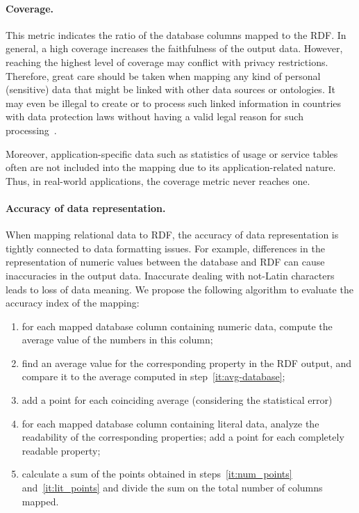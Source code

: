 \paragraph{Coverage.}
This metric indicates the ratio of the database columns mapped to the RDF. 
In general, a high coverage increases the faithfulness of the output data.
However, reaching the highest level of coverage may conflict with privacy restrictions.
Therefore, great care should be taken when mapping any kind of personal (sensitive) data that might be linked with other data sources or ontologies.
It may even be illegal to create or to process such linked information in countries with data protection laws without having a valid legal reason for such processing~\cite{bechhofer2004owl}.
 
Moreover, application-specific data such as statistics of usage or service tables often are not included into the mapping due to its application-related nature.
Thus, in real-world applications, the coverage metric never reaches one.

\paragraph{Accuracy of data representation.}
When mapping relational data to RDF, the accuracy of data representation is tightly connected to data formatting issues.
For example, differences in the representation of numeric values between the database and RDF can cause inaccuracies in the output data.
Inaccurate dealing with not-Latin characters leads to loss of data meaning. 
We propose the following algorithm to evaluate the accuracy index of the mapping:

\begin{enumerate}
\item\label{it:avg-database} for each mapped database column containing numeric data, compute the average value of the numbers in this column;
\item find an average value for the corresponding property in the RDF output, and compare it to the average computed in step~\ref{it:avg-database};
\item\label{it:num_points} add a point for each coinciding average (considering the statistical error)
\item\label{it:lit_points} for each mapped database column containing literal data, analyze the readability of the corresponding properties; add a point for each completely readable property;
\item calculate a sum of the points obtained in steps~\ref{it:num_points} and~\ref{it:lit_points} and divide the sum on the total number of columns mapped.
\end{enumerate}

